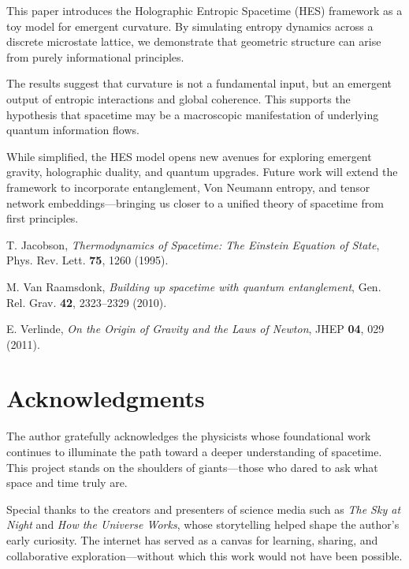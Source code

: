 \documentclass[12pt]{article}
\begin{document}
This paper introduces the Holographic Entropic Spacetime (HES) framework as a toy model for emergent curvature. By simulating entropy dynamics across a discrete microstate lattice, we demonstrate that geometric structure can arise from purely informational principles.

The results suggest that curvature is not a fundamental input, but an emergent output of entropic interactions and global coherence. This supports the hypothesis that spacetime may be a macroscopic manifestation of underlying quantum information flows.

While simplified, the HES model opens new avenues for exploring emergent gravity, holographic duality, and quantum upgrades. Future work will extend the framework to incorporate entanglement, Von Neumann entropy, and tensor network embeddings—bringing us closer to a unified theory of spacetime from first principles.



\begin{thebibliography}{9}

T. Jacobson, \textit{Thermodynamics of Spacetime: The Einstein Equation of State}, Phys. Rev. Lett. \textbf{75}, 1260 (1995).

M. Van Raamsdonk, \textit{Building up spacetime with quantum entanglement}, Gen. Rel. Grav. \textbf{42}, 2323–2329 (2010).

E. Verlinde, \textit{On the Origin of Gravity and the Laws of Newton}, JHEP \textbf{04}, 029 (2011).

\end{thebibliography}

\section*{Acknowledgments}

The author gratefully acknowledges the physicists whose foundational work continues to illuminate the path toward a deeper understanding of spacetime. This project stands on the shoulders of giants—those who dared to ask what space and time truly are.

Special thanks to the creators and presenters of science media such as \textit{The Sky at Night} and \textit{How the Universe Works}, whose storytelling helped shape the author's early curiosity. The internet has served as a canvas for learning, sharing, and collaborative exploration—without which this work would not have been possible.
\end{document}
